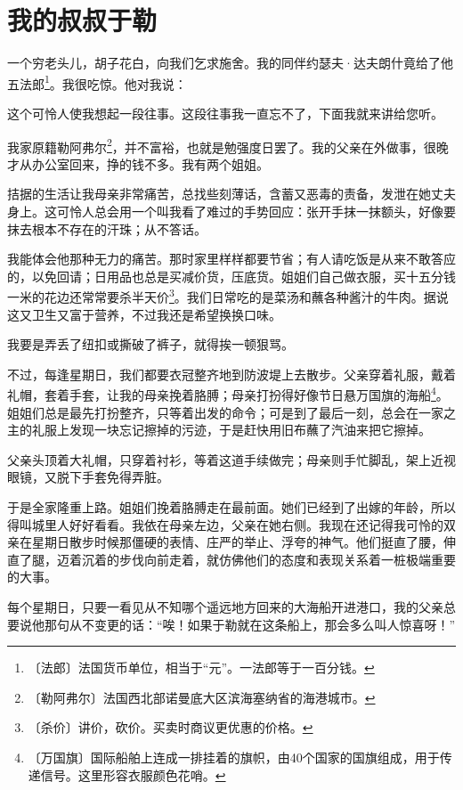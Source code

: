 \documentclass[12pt,UTF-8,openany]{ctexbook}
\begin{document}
\chapter{我的叔叔于勒}

\begin{large}
    
    一个穷老头儿，胡子花白，向我们乞求施舍。我的同伴约瑟夫·达夫朗什竟给了他五法郎\footnote{〔法郎〕法国货币单位，相当于“元”。一法郎等于一百分钱。}。我很吃惊。他对我说：
    
    这个可怜人使我想起一段往事。这段往事我一直忘不了，下面我就来讲给您听。
    
    我家原籍勒阿弗尔\footnote{〔勒阿弗尔〕法国西北部诺曼底大区滨海塞纳省的海港城市。}，并不富裕，也就是勉强度日罢了。我的父亲在外做事，很晚才从办公室回来，挣的钱不多。我有两个姐姐。
    
    拮据的生活让我母亲非常痛苦，总找些刻薄话，含蓄又恶毒的责备，发泄在她丈夫身上。这可怜人总会用一个叫我看了难过的手势回应：张开手抹一抹额头，好像要抹去根本不存在的汗珠；从不答话。
    
    我能体会他那种无力的痛苦。那时家里样样都要节省；有人请吃饭是从来不敢答应的，以免回请；日用品也总是买减价货，压底货。姐姐们自己做衣服，买十五分钱一米的花边还常常要杀半天价\footnote{〔杀价〕讲价，砍价。买卖时商议更优惠的价格。}。我们日常吃的是菜汤和蘸各种酱汁的牛肉。据说这又卫生又富于营养，不过我还是希望换换口味。
    
    我要是弄丢了纽扣或撕破了裤子，就得挨一顿狠骂。
    
    不过，每逢星期日，我们都要衣冠整齐地到防波堤上去散步。父亲穿着礼服，戴着礼帽，套着手套，让我的母亲挽着胳膊；母亲打扮得好像节日悬万国旗的海船\footnote{〔万国旗〕国际船舶上连成一排挂着的旗帜，由40个国家的国旗组成，用于传递信号。这里形容衣服颜色花哨。}。姐姐们总是最先打扮整齐，只等着出发的命令；可是到了最后一刻，总会在一家之主的礼服上发现一块忘记擦掉的污迹，于是赶快用旧布蘸了汽油来把它擦掉。
    
    父亲头顶着大礼帽，只穿着衬衫，等着这道手续做完；母亲则手忙脚乱，架上近视眼镜，又脱下手套免得弄脏。
    
    于是全家隆重上路。姐姐们挽着胳膊走在最前面。她们已经到了出嫁的年龄，所以得叫城里人好好看看。我依在母亲左边，父亲在她右侧。我现在还记得我可怜的双亲在星期日散步时候那僵硬的表情、庄严的举止、浮夸的神气。他们挺直了腰，伸直了腿，迈着沉着的步伐向前走着，就仿佛他们的态度和表现关系着一桩极端重要的大事。
    
    每个星期日，只要一看见从不知哪个遥远地方回来的大海船开进港口，我的父亲总要说他那句从不变更的话：“唉！如果于勒就在这条船上，那会多么叫人惊喜呀！”
    

\end{large}
\end{document}
